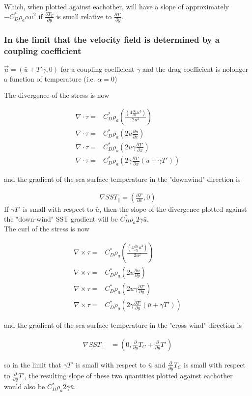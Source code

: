 \documentclass[12pt,a4paper]{article}
\newcommand{\dudx}{\frac{\partial u}{\partial x}}
\newcommand{\dudy}{\frac{\partial u}{\partial y}}
\newcommand{\dTpdx}{\frac{\partial T'}{\partial x}}
\newcommand{\dTpdy}{\frac{\partial T'}{\partial y}}
\begin{document}
Which, when plotted against eachother, will have a slope of approximately $ -C_D^* \rho_a \alpha\bar{u}^2$ if $\frac{\partial T_C}{\partial y}$ is small relative to $\dTpdy$.

\subsubsection*{In the limit that the velocity field is determined by a coupling coefficient }
 $\vec{u} = (\bar{u} + T' \gamma, 0)$ for a coupling coefficient $\gamma$ and the drag coefficient is nolonger a function of temperature (i.e. $\alpha = 0$)

The divergence of the stress is now

\begin{align*}
\nabla \cdot \tau =& C_D^* \rho_a \left( \frac{(4\dudx u^3)}{2u^2} \right)\\
\nabla \cdot \tau =& C_D^* \rho_a \left( 2u\dudx \right)\\
\nabla \cdot \tau =& C_D^* \rho_a \left( 2u\gamma\dTpdx  \right)\\
\nabla \cdot \tau =& C_D^* \rho_a \left( 2\gamma\dTpdx (\bar{u} + \gamma T') \right)
\end{align*}

and the gradient of the sea surface temperature in the "downwind" direction is 

\begin{align*}
\nabla SST_{\parallel} = \left( \dTpdx, 0 \right)
\end{align*}
If $\gamma T'$ is small with respect to $\bar{u}$, then the slope of the divergence plotted against the "down-wind" SST gradient will be $C_D^*\rho_a 2\gamma\bar{u}$. \\

The curl of the stress is now

\begin{align*}
\nabla \times \tau =& C_D^* \rho_a \left( \frac{(4\dudy u^3 )}{2u^2} \right)\\
\nabla \times \tau =& C_D^* \rho_a \left(  2u\dudy \right)\\
\nabla \times \tau =& C_D^* \rho_a \left(  2u\gamma\dTpdy \right)\\
\nabla \times \tau =& C_D^* \rho_a \left( 2\gamma\dTpdy (\bar{u} + \gamma T') \right)
\end{align*}

and the gradient of the sea surface temperature in the "cross-wind" direction is 

\begin{align*}
\nabla SST_{\bot} &= \left(0 , \frac{\partial}{\partial y}T_C+ \frac{\partial}{\partial y}T' \right)
\end{align*}

so in the limit that  $\gamma T'$ is small with respect to $\bar{u}$ and $\frac{\partial}{\partial y}T_C$ is small with respect to $\frac{\partial}{\partial y}T'$, the resulting slope of these two quantities plotted against eachother would also be $C_D^* \rho_a 2\gamma\bar{u}$. \\
\end{document}

